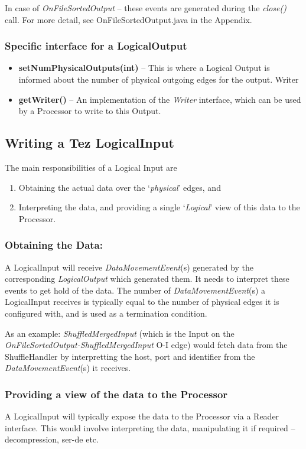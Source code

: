 \documentclass[twocolumn]{article}
\newcommand{\bi}{\begin{itemize}}
\newcommand{\ei}{\end{itemize}}
\newcommand{\be}{\begin{enumerate}}
\newcommand{\ee}{\end{enumerate}}
\newcommand{\ii}{\item}
\begin{document}
In case of \textit{OnFileSortedOutput} -- these events are generated during the
\textit{close()} call.
For more detail, see OnFileSortedOutput.java in the Appendix.

\subsubsection*{Specific interface for a LogicalOutput}

\bi
\ii \textbf{setNumPhysicalOutputs(int)} -- This is where a Logical Output is informed
about the number of physical outgoing edges for the output. Writer
\ii \textbf{getWriter()} -- An implementation of the \textit{Writer} interface, which can be
used by a Processor to write to this Output.
\ei

\subsection{Writing a Tez LogicalInput}

The main responsibilities of a Logical Input are
\be
\ii Obtaining the actual data over the `\textit{physical}' edges, and 
\ii Interpreting the data, and providing a single `\textit{Logical}' view of this data to the Processor.
\ee

\subsubsection*{Obtaining the Data:}
A LogicalInput will receive \textit{DataMovementEvent}(s) generated by the
corresponding \textit{LogicalOutput} which generated them. It needs to interpret
these events to get hold of the data. The number of \textit{DataMovementEvent}(s)
a LogicalInput receives is typically equal to the number of physical
edges it is configured with, and is used as a termination condition.

As an example: \textit{ShuffledMergedInput} (which is the Input on the
\textit{OnFileSortedOutput-ShuffledMergedInput} O-I edge) would fetch data from
the ShuffleHandler by interpretting the host, port and identifier from
the \textit{DataMovementEvent}(s) it receives.

\subsubsection*{Providing a view of the data to the Processor} 
A LogicalInput will typically expose the data to the Processor via a
Reader interface. This would involve interpreting the data, manipulating
it if required -- decompression, ser-de etc.
\end{document}
